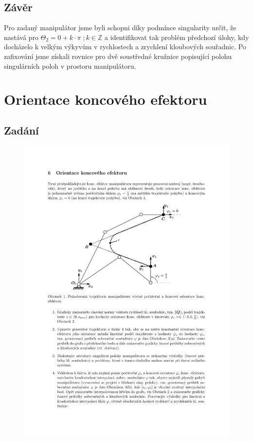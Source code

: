 \documentclass{article}
\begin{document}
		\subsection{Závěr}
			Pro zadaný manipulátor jsme byli schopni díky podmínce singularity určit, že nastává pro \(\Theta_2 = 0 +k\cdot\pi \; ;k\in \mathbb{Z}\) a identifikovat tak problém předchozí úlohy, kdy docházelo k velkým výkyvům v rychlostech a zrychlení kloubových souřadnic. Po zafixování jsme získali rovnice pro dvě soustředné kružnice popisující polohu singulárních poloh v prostoru manipulátoru.
	\section{Orientace koncového efektoru}
		\subsection{Zadání}
			\begin{figure}[H]
				\centering
				\includegraphics[width=\textwidth]{./Graphics/6_Graphics/6_zadani}
			\end{figure}
\end{document}
